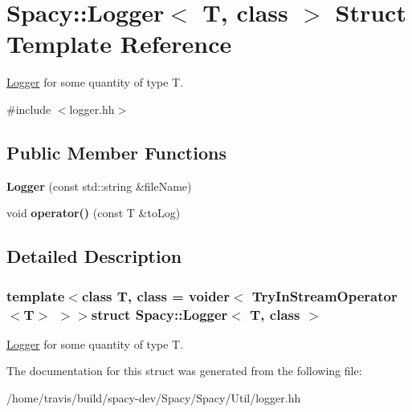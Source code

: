 \hypertarget{structSpacy_1_1Logger}{\section{Spacy\-:\-:Logger$<$ T, class $>$ Struct Template Reference}
\label{structSpacy_1_1Logger}
}


\hyperlink{structSpacy_1_1Logger}{Logger} for some quantity of type T.  




{\ttfamily \#include $<$logger.\-hh$>$}

\subsection*{Public Member Functions}
\begin{DoxyCompactItemize}
\item 
\hypertarget{structSpacy_1_1Logger_a689f95f10f159c8f4c3a841ffcdeaac8}{{\bfseries Logger} (const std\-::string \&file\-Name)}\label{structSpacy_1_1Logger_a689f95f10f159c8f4c3a841ffcdeaac8}

\item 
\hypertarget{structSpacy_1_1Logger_a4ee5bc204534bc4a3bd9b7e875c3a350}{void {\bfseries operator()} (const T \&to\-Log)}\label{structSpacy_1_1Logger_a4ee5bc204534bc4a3bd9b7e875c3a350}

\end{DoxyCompactItemize}


\subsection{Detailed Description}
\subsubsection*{template$<$class T, class = voider$<$ Try\-In\-Stream\-Operator$<$\-T$>$ $>$$>$struct Spacy\-::\-Logger$<$ T, class $>$}

\hyperlink{structSpacy_1_1Logger}{Logger} for some quantity of type T. 

The documentation for this struct was generated from the following file\-:\begin{DoxyCompactItemize}
\item 
/home/travis/build/spacy-\/dev/\-Spacy/\-Spacy/\-Util/logger.\-hh\end{DoxyCompactItemize}
